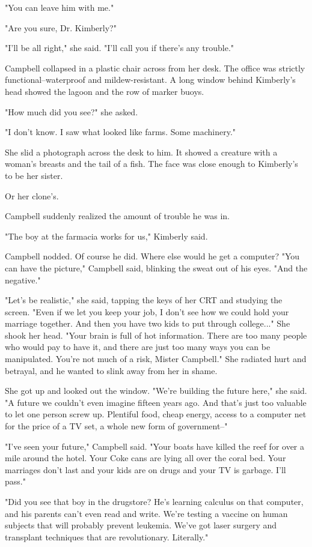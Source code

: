 "You can leave him with me."

"Are you sure, Dr. Kimberly?"

"I'll be all right," she said. "I'll call you if there's any trouble."

Campbell collapsed in a plastic chair across from her desk. The office was strictly functional--waterproof and mildew-resistant. A long window behind Kimberly's head showed the lagoon and the row of marker buoys.

"How much did you see?" she asked.

"I don't know. I saw what looked like farms. Some machinery."

She slid a photograph across the desk to him. It showed a creature with a woman's breasts and the tail of a fish. The face was close enough to Kimberly's to be her sister.

Or her clone's.

Campbell suddenly realized the amount of trouble he was in.

"The boy at the farmacia works for us," Kimberly said.

Campbell nodded. Of course he did. Where else would he get a computer? "You can have the picture," Campbell said, blinking the sweat out of his eyes. "And the negative."

"Let's be realistic," she said, tapping the keys of her CRT and studying the screen. "Even if we let you keep your job, I don't see how we could hold your marriage together. And then you have two kids to put through college..." She shook her head. "Your brain is full of hot information. There are too many people who would pay to have it, and there are just too many ways you can be manipulated. You're not much of a risk, Mister Campbell." She radiated hurt and betrayal, and he wanted to slink away from her in shame.

She got up and looked out the window. "We're building the future here," she said. "A future we couldn't even imagine fifteen years ago. And that's just too valuable to let one person screw up. Plentiful food, cheap energy, access to a computer net for the price of a TV set, a whole new form of government--"

"I've seen your future," Campbell said. "Your boats have killed the reef for over a mile around the hotel. Your Coke cans are lying all over the coral bed. Your marriages don't last and your kids are on drugs and your TV is garbage. I'll pass."

"Did you see that boy in the drugstore? He's learning calculus on that computer, and his parents can't even read and write. We're testing a vaccine on human subjects that will probably prevent leukemia. We've got laser surgery and transplant techniques that are revolutionary. Literally."

